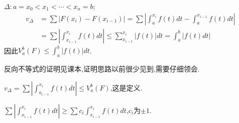 \documentclass[12pt,a4paper,openany]{book}
\begin{document}
\begin{enumerate}
$\Delta:a=x_0<x_1<\cdots<x_n=b$;
\[
\begin{aligned}
v_{\Delta} &= \sum{|F(x_i) - F(x_{i-1})|} = \sum{|\int_{a}^{x_i}{f(t)dt} - \int_{a}^{x_{i-1}}{f(t)dt}|}\\
&=\sum{|\int_{x_{i-1}}^{x_i}{f(t)dt}|} \le \sum_{x_{i-1}}^{x_i}{|f(t)|dt} = \int_{a}^{b}{|f(t)dt|}
\end{aligned}
\]
因此$V_{a}^{b}{(F)} \le \int_{a}^{b}{|f(t)|dt}$.

反向不等式的证明见课本,证明思路以前很少见到,需要仔细领会.

$v_{\Delta} = \sum{|\int_{a_{i-1}}^{x_i}{f(t)dt}|} \le V_{a}^{b}{(F)}$,这是定义.

$\sum{|\int_{x_{i-1}}^{x_i}{f(t)dt}| \ge \sum{c_i\int_{x_{i-1}}^{x_i}{f(t)dt}}}$,$c_i$为$\pm1$.
\end{enumerate}
\end{document}
